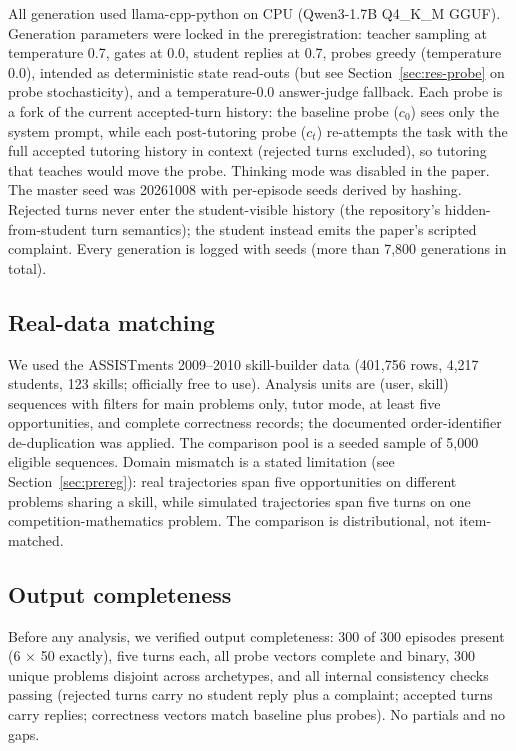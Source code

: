 \documentclass[12pt,a4paper]{article}
\begin{document}
All generation used llama-cpp-python on CPU (Qwen3-1.7B Q4\_K\_M GGUF).
Generation parameters were locked in the preregistration: teacher sampling
at temperature 0.7, gates at 0.0, student replies at 0.7, probes greedy
(temperature 0.0), intended as deterministic state read-outs (but see
Section~\ref{sec:res-probe} on probe stochasticity), and a temperature-0.0
answer-judge fallback. Each probe is a fork of the current accepted-turn
history: the baseline probe ($c_0$) sees only the system prompt, while each
post-tutoring probe ($c_t$) re-attempts the task with the full accepted
tutoring history in context (rejected turns excluded), so tutoring that
teaches would move the probe. Thinking mode was disabled in the paper. The master
seed was 20261008 with per-episode seeds derived by hashing. Rejected turns
never enter the student-visible history (the repository's hidden-from-student
turn semantics); the student instead emits the paper's scripted complaint.
Every generation is logged with seeds (more than 7{,}800 generations in
total).

\subsection{Real-data matching}

We used the ASSISTments 2009--2010 skill-builder data (401{,}756 rows,
4{,}217 students, 123 skills; officially free to use). Analysis units are
(user, skill) sequences with filters for main problems only, tutor mode, at
least five opportunities, and complete correctness records; the documented
order-identifier de-duplication was applied. The comparison pool is a seeded
sample of 5{,}000 eligible sequences. Domain mismatch is a stated limitation
(see Section~\ref{sec:prereg}): real trajectories span five opportunities on
different problems sharing a skill, while simulated trajectories span five
turns on one competition-mathematics problem. The comparison is
distributional, not item-matched.

\subsection{Output completeness}

Before any analysis, we verified output completeness: 300 of 300 episodes
present (6 $\times$ 50 exactly), five turns each, all probe vectors complete
and binary, 300 unique problems disjoint across archetypes, and all internal
consistency checks passing (rejected turns carry no student reply plus a
complaint; accepted turns carry replies; correctness vectors match baseline
plus probes). No partials and no gaps.
\end{document}
